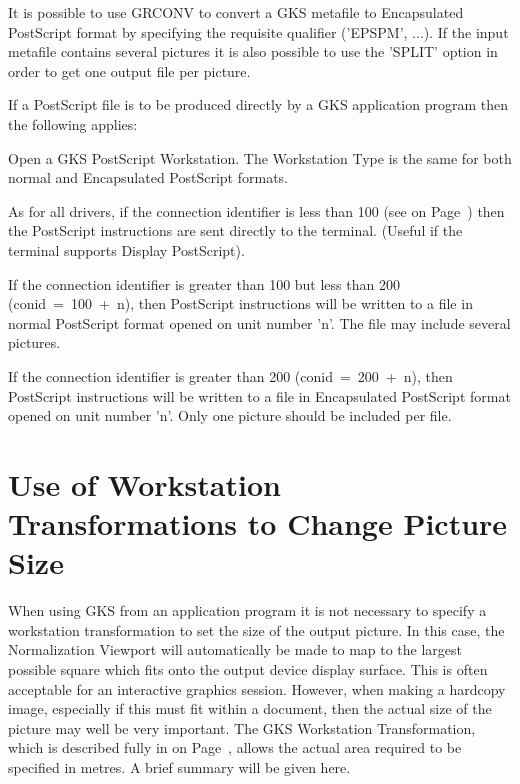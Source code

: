 It is possible to use GRCONV to convert a GKS metafile to Encapsulated
PostScript format by specifying the requisite qualifier ('EPSPM', ...).
If the input metafile contains several pictures it is also possible to
use the 'SPLIT' option in order to get one output file per picture.
 
If a PostScript file is to be produced directly by a GKS application
program then the following applies:
\begin{OL}
\item
Open a GKS PostScript Workstation. The Workstation Type is the same
for both normal and Encapsulated PostScript formats.
\item
As for all drivers, if the connection identifier is less than 100
(see on Page~\pageref{sec:conref}) then the PostScript instructions
are sent directly to the terminal.
(Useful if the terminal supports Display PostScript).
\item
If the connection identifier is greater than 100 but less than 200
(conid~=~100~+~n), then PostScript instructions will be
written to a file in normal PostScript format opened on unit number 'n'.
The file may include several pictures.
\item
If the connection identifier is greater than 200
(conid~=~200~+~n), then PostScript instructions will be
written to a file in Encapsulated PostScript format opened on unit number 'n'.
Only one picture should be included per file.
\end{OL}
\section{Use of Workstation Transformations to Change Picture Size}
 
When using GKS from an application program it is not necessary to
specify a workstation transformation to set the size of the output picture.
In this case, the Normalization Viewport will automatically be made to map to
the largest possible square which fits onto the output device display surface.
This is often acceptable for an interactive graphics session.
However, when making a hardcopy image, especially if this
must fit within a document, then the actual size of the picture may
well be very important.
The GKS Workstation Transformation, which is described fully in
on Page~\pageref{sec:gkspr}, allows the actual area required
to be specified in metres.
A brief summary will be given here.
 
